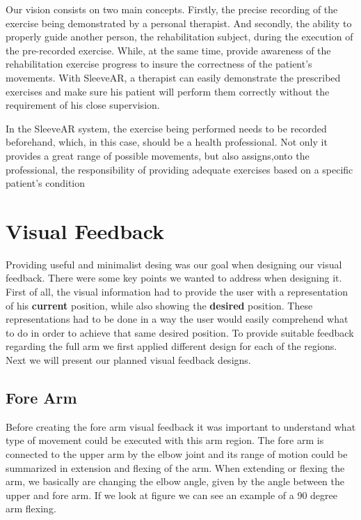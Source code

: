 Our vision consists on two main concepts. Firstly, the precise recording of the exercise being demonstrated by a personal therapist. 
And secondly, the ability to properly guide another person, the rehabilitation subject, during the execution of the pre-recorded exercise. 
While, at the same time, provide awareness of the rehabilitation exercise progress to insure the correctness of the patient's movements.
With SleeveAR, a therapist can easily demonstrate the prescribed exercises and make sure his patient will perform them correctly without the requirement of his close supervision.

In the SleeveAR system, the exercise being performed needs to be recorded beforehand, which, in this case, should be a health professional. 
Not only it provides a great range of possible movements, but also assigns,onto the professional, the responsibility of providing adequate exercises based on a specific patient's condition


\section{Visual Feedback}

Providing useful and minimalist desing was our goal when designing our visual feedback. There were some key points we wanted to address when designing it.
First of all, the visual information had to provide the user with a representation of his \textbf{current} position, while also showing the \textbf{desired} position. 
These representations had to be done in a way the user would easily comprehend what to do in order to achieve that same desired position.
To provide suitable feedback regarding the full arm we first applied different design for each of the regions. Next we will present our planned visual feedback designs.

\subsection{Fore Arm}

Before creating the fore arm visual feedback it was important to understand what type of movement could be executed with this arm region.
The fore arm is connected to the upper arm by the elbow joint and its range of motion could be summarized in extension and flexing of the arm.
When extending or flexing the arm, we basically are changing the elbow angle, given by the angle between the upper and fore arm.
If we look at figure  we can see an example of a 90 degree arm flexing.

